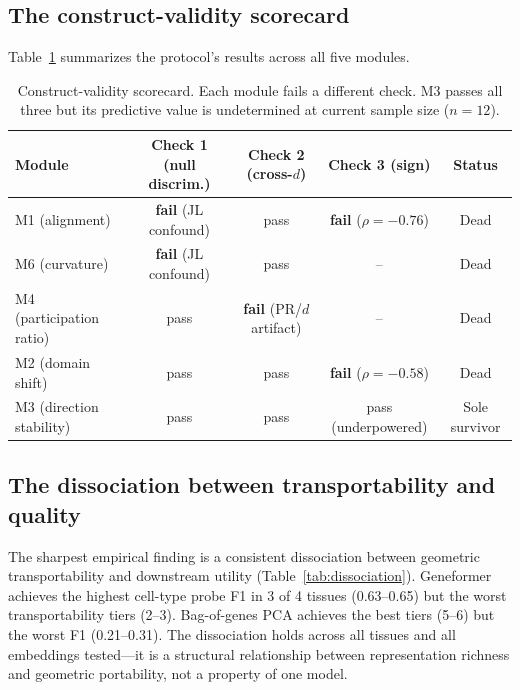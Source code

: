 \documentclass[10pt,letterpaper]{article}
\begin{document}
\subsection{The construct-validity scorecard}

Table~\ref{tab:scorecard} summarizes the protocol's results across all five modules.

\begin{table}[t]
\centering
\caption{Construct-validity scorecard. Each module fails a different check. M3 passes all three but its predictive value is undetermined at current sample size ($n = 12$).}
\label{tab:scorecard}
\small
\begin{tabular}{@{}lcccc@{}}
\toprule
Module & Check 1 (null discrim.) & Check 2 (cross-$d$) & Check 3 (sign) & Status \\
\midrule
M1 (alignment) & \textbf{fail} (JL confound) & pass & \textbf{fail} ($\rho = -0.76$) & Dead \\
M6 (curvature) & \textbf{fail} (JL confound) & pass & -- & Dead \\
M4 (participation ratio) & pass & \textbf{fail} (PR/$d$ artifact) & -- & Dead \\
M2 (domain shift) & pass & pass & \textbf{fail} ($\rho = -0.58$) & Dead \\
M3 (direction stability) & pass & pass & pass (underpowered) & Sole survivor \\
\bottomrule
\end{tabular}
\end{table}

\subsection{The dissociation between transportability and quality}

The sharpest empirical finding is a consistent dissociation between geometric transportability and downstream utility (Table~\ref{tab:dissociation}). Geneformer achieves the highest cell-type probe F1 in 3 of 4 tissues (0.63--0.65) but the worst transportability tiers (2--3). Bag-of-genes PCA achieves the best tiers (5--6) but the worst F1 (0.21--0.31). The dissociation holds across all tissues and all embeddings tested---it is a structural relationship between representation richness and geometric portability, not a property of one model.
\end{document}
